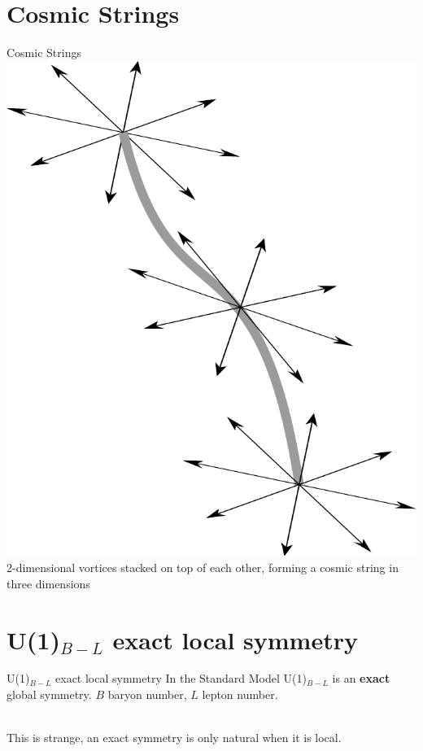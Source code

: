 \documentclass[14pt]{beamer}
\begin{document}
\section{Cosmic Strings}
\begin{frame}{Cosmic Strings}
  \includegraphics[scale=0.4]{chapters/figures/string.pdf} %
2-dimensional vortices stacked on top of each other, forming a cosmic string in three dimensions 

\end{frame}



\section{U(1)$_{B-L}$ exact local symmetry}
\begin{frame}{U(1)$_{B-L}$ exact local symmetry}
In the Standard Model U(1)$_{B-L}$ is an \textbf{exact} global symmetry. $B$ baryon number, $L$ lepton number.\\~\

This is strange, an exact symmetry is only natural when it is local.\\~\
\end{frame}
\end{document}
